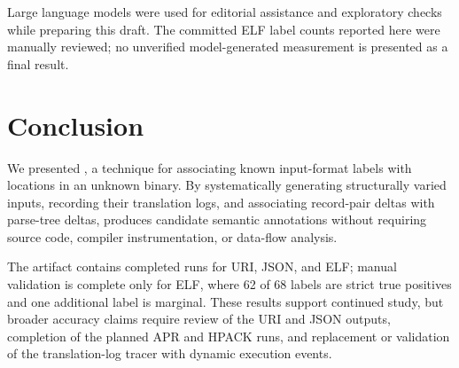 Large language models were used for editorial assistance and exploratory checks while preparing this draft.
The committed ELF label counts reported here were manually reviewed; no unverified model-generated measurement is presented as a final result.

\section{Conclusion}\label{sec:conclusion}

We presented \toolname, a technique for associating known input-format labels with locations in an unknown binary.
By systematically generating structurally varied inputs, recording their \QEMU translation logs, and associating record-pair deltas with parse-tree deltas, \toolname produces candidate semantic annotations without requiring source code, compiler instrumentation, or data-flow analysis.

The artifact contains completed runs for URI, JSON, and ELF; manual validation is complete only for ELF, where 62 of 68 labels are strict true positives and one additional label is marginal.
These results support continued study, but broader accuracy claims require review of the URI and JSON outputs, completion of the planned APR and HPACK runs, and replacement or validation of the translation-log tracer with dynamic execution events.
